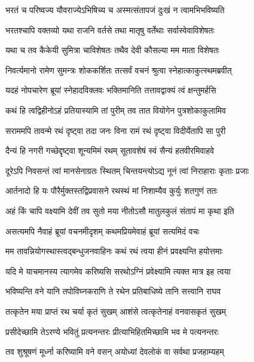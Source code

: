 \twolineshloka
{भरतं च परिष्वज्य यौवराज्येऽभिषिच्य च}
{अस्मत्संतापजं दुःखं न त्वामभिभविष्यति} %

\twolineshloka
{भरतश्चापि वक्तव्यो यथा राजनि वर्तसे}
{तथा मातृषु वर्तेथाः सर्वास्वेवाविशेषतः} %

\twolineshloka
{यथा च तव कैकेयी सुमित्रा चाविशेषतः}
{तथैव देवी कौसल्या मम माता विशेषतः} %

\twolineshloka
{निवर्त्यमानो रामेण सुमन्त्रः शोककर्शितः}
{तत्सर्वं वचनं श्रुत्वा स्नेहात्काकुत्स्थमब्रवीत्} %

\twolineshloka
{यदहं नोपचारेण ब्रूयां स्नेहादविक्लवः}
{भक्तिमानिति तत्तावद्वाक्यं त्वं क्षन्तुमर्हसि} %

\twolineshloka
{कथं हि त्वद्विहीनोऽहं प्रतियास्यामि तां पुरीम्}
{तव तात वियोगेन पुत्रशोकाकुलामिव} %

\twolineshloka
{सराममपि तावन्मे रथं दृष्ट्वा तदा जनः}
{विना रामं रथं दृष्ट्वा विदीर्येतापि सा पुरी} %

\twolineshloka
{दैन्यं हि नगरी गच्छेद्दृष्ट्वा शून्यमिमं रथम्}
{सूतावशेषं स्वं सैन्यं हतवीरमिवाहवे} %

\twolineshloka
{दूरेऽपि निवसन्तं त्वां मानसेनाग्रतः स्थितम्}
{चिन्तयन्त्योऽद्य नूनं त्वां निराहाराः कृताः प्रजाः} %

\twolineshloka
{आर्तनादो हि यः पौरैर्मुक्तस्तद्विप्रवासने}
{रथस्थं मां निशाम्यैव कुर्युः शतगुणं ततः} %

\twolineshloka
{अहं किं चापि वक्ष्यामि देवीं तव सुतो मया}
{नीतोऽसौ मातुलकुलं संतापं मा कृथा इति} %

\twolineshloka
{असत्यमपि नैवाहं ब्रूयां वचनमीदृशम्}
{कथमप्रियमेवाहं ब्रूयां सत्यमिदं वचः} %

\twolineshloka
{मम तावन्नियोगस्थास्त्वद्बन्धुजनवाहिनः}
{कथं रथं त्वया हीनं प्रवक्ष्यन्ति हयोत्तमाः} %

\twolineshloka
{यदि मे याचमानस्य त्यागमेव करिष्यसि}
{सरथोऽग्निं प्रवेक्ष्यामि त्यक्त मात्र इह त्वया} %

\twolineshloka
{भविष्यन्ति वने यानि तपोविघ्नकराणि ते}
{रथेन प्रतिबाधिष्ये तानि सत्त्वानि राघव} %

\twolineshloka
{तत्कृतेन मया प्राप्तं रथ चर्या कृतं सुखम्}
{आशंसे त्वत्कृतेनाहं वनवासकृतं सुखम्} %

\twolineshloka
{प्रसीदेच्छामि तेऽरण्ये भवितुं प्रत्यनन्तरः}
{प्रीत्याभिहितमिच्छामि भव मे पत्यनन्तरः} %

\twolineshloka
{तव शुश्रूषणं मूर्ध्ना करिष्यामि वने वसन्}
{अयोध्यां देवलोकं वा सर्वथा प्रजहाम्यहम्} %

